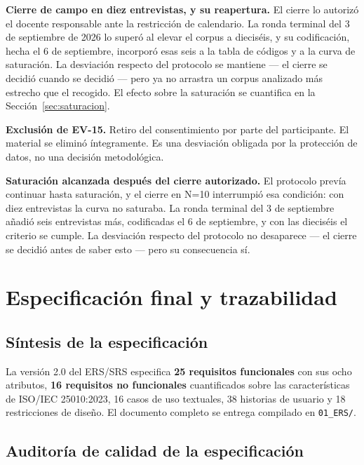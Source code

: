 \documentclass[11pt,a4paper]{article}
\begin{document}
\textbf{Cierre de campo en diez entrevistas, y su reapertura.} El cierre lo autoriz\'o el
docente responsable ante la restricci\'on de calendario. La ronda terminal del 3 de
septiembre de 2026 lo super\'o al elevar el corpus a diecis\'eis, y su codificaci\'on, hecha
el 6 de septiembre, incorpor\'o esas seis a la tabla de c\'odigos y a la curva de
saturaci\'on. La desviaci\'on respecto del protocolo se mantiene --- el cierre se decidi\'o
cuando se decidi\'o --- pero ya no arrastra un corpus analizado m\'as estrecho que el
recogido. El efecto sobre la saturaci\'on se cuantifica en la
Secci\'on~\ref{sec:saturacion}.

\textbf{Exclusi\'on de EV-15.} Retiro del consentimiento por parte del participante. El
material se elimin\'o \'integramente. Es una desviaci\'on obligada por la protecci\'on de
datos, no una decisi\'on metodol\'ogica.

\textbf{Saturaci\'on alcanzada despu\'es del cierre autorizado.} El protocolo prev\'ia
continuar hasta saturaci\'on, y el cierre en N=10 interrumpi\'o esa condici\'on: con diez
entrevistas la curva no saturaba. La ronda terminal del 3 de septiembre a\~nadi\'o seis
entrevistas m\'as, codificadas el 6 de septiembre, y con las diecis\'eis el criterio se
cumple. La desviaci\'on respecto del protocolo no desaparece --- el cierre se decidi\'o
antes de saber esto --- pero su consecuencia s\'i.

\section{Especificaci\'on final y trazabilidad}

\subsection{S\'intesis de la especificaci\'on}

La versi\'on 2.0 del ERS/SRS especifica \textbf{25 requisitos funcionales} con sus ocho
atributos, \textbf{16 requisitos no funcionales} cuantificados sobre las
caracter\'isticas de ISO/IEC 25010:2023, 16 casos de uso textuales, 38 historias de
usuario y 18 restricciones de dise\~no. El documento completo se entrega compilado en
\texttt{01\_ERS/}.

\subsection{Auditor\'ia de calidad de la especificaci\'on}
\end{document}
